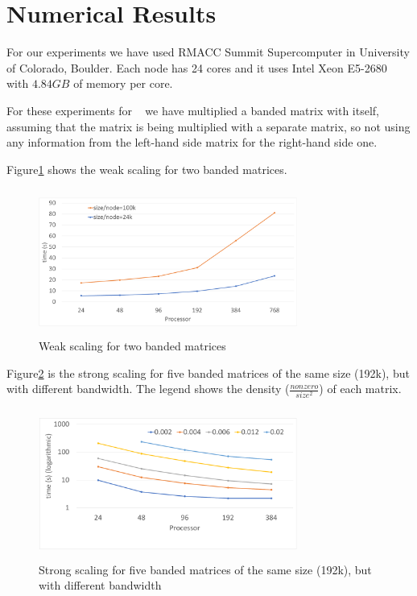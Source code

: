 \section{Numerical Results}
\label{sec:results}

For our experiments we have used RMACC Summit Supercomputer in University of Colorado, Boulder. Each node has 24 cores and it uses Intel Xeon E5-2680 with $4.84GB$ of memory per core.

For these experiments for \mm~ we have multiplied a banded matrix with itself, assuming that the matrix is being multiplied with a separate matrix, so not using any information from the left-hand side matrix for the right-hand side one.

Figure\ref{fig:weak1} shows the weak scaling for two banded matrices.

\begin{figure}[tbh]
 \centering
 \includegraphics[width=8.5cm,height=4.8cm]{./figures/weak1.pdf}
 \caption{Weak scaling for two banded matrices}
 \label{fig:weak1}
\end{figure}

Figure\ref{fig:strong1} is the strong scaling for five banded matrices of the same size (192k), but with different bandwidth. The legend shows the density ($\frac{nonzero}{size^2}$) of each matrix.

\begin{figure}[tbh]
 \centering
 \includegraphics[width=8.5cm,height=4.9cm]{./figures/strong1.pdf}
 \caption{Strong scaling for five banded matrices of the same size (192k), but with different bandwidth}
 \label{fig:strong1}
\end{figure}

